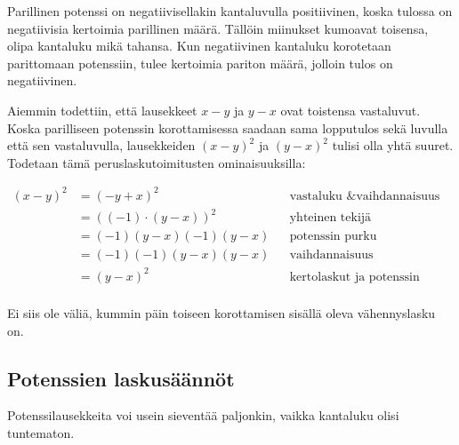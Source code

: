 Parillinen potenssi on negatiivisellakin kantaluvulla positiivinen, koska tulossa on negatiivisia kertoimia parillinen määrä. Tällöin miinukset kumoavat toisensa, olipa kantaluku mikä tahansa. Kun negatiivinen kantaluku korotetaan parittomaan potenssiin, tulee kertoimia pariton määrä, jolloin tulos on negatiivinen.

\begin{esimerkki}
\end{esimerkki}

\begin{esimerkki}
Aiemmin todettiin, että lausekkeet $x-y$ ja $y-x$ ovat toistensa vastaluvut. Koska parilliseen potenssin korottamisessa saadaan sama lopputulos sekä luvulla että sen vastaluvulla, lausekkeiden $(x-y)^2$ ja $(y-x)^2$ tulisi olla yhtä suuret. Todetaan tämä peruslaskutoimitusten ominaisuuksilla:

\begin{align*}
(x-y)^2&=(-y+x)^2 && \text{vastaluku \& vaihdannaisuus} \\
&=\left((-1)\cdot(y-x) \right)^2 && \text{yhteinen tekijä} \\
&=(-1)(y-x)(-1)(y-x) && \text{potenssin purku} \\
&=(-1)(-1)(y-x)(y-x) && \text{vaihdannaisuus} \\
&=(y-x)^2 && \text{kertolaskut ja potenssin määritelmä} \\
\end{align*}

Ei siis ole väliä, kummin päin toiseen korottamisen sisällä oleva vähennyslasku on.

\end{esimerkki}


\subsection{Potenssien laskusäännöt}

Potenssilausekkeita voi usein sieventää paljonkin, vaikka kantaluku olisi tuntematon.

